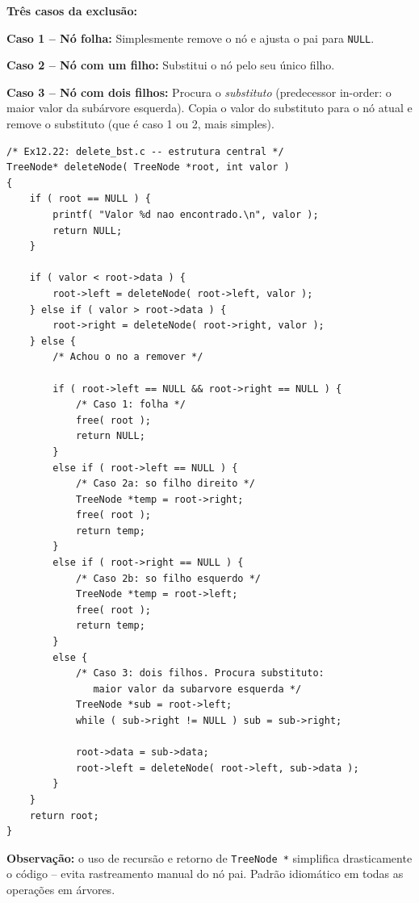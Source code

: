 \documentclass[12pt,a4paper]{article}
\begin{document}
\begin{respostabox}
\textbf{Três casos da exclusão:}

\textbf{Caso 1 -- Nó folha:}
Simplesmente remove o nó e ajusta o pai para \texttt{NULL}.

\textbf{Caso 2 -- Nó com um filho:}
Substitui o nó pelo seu único filho.

\textbf{Caso 3 -- Nó com dois filhos:}
Procura o \textit{substituto} (predecessor in-order: o maior valor da subárvore
esquerda). Copia o valor do substituto para o nó atual e remove o substituto
(que é caso 1 ou 2, mais simples).

\begin{lstlisting}
/* Ex12.22: delete_bst.c -- estrutura central */
TreeNode* deleteNode( TreeNode *root, int valor )
{
    if ( root == NULL ) {
        printf( "Valor %d nao encontrado.\n", valor );
        return NULL;
    }

    if ( valor < root->data ) {
        root->left = deleteNode( root->left, valor );
    } else if ( valor > root->data ) {
        root->right = deleteNode( root->right, valor );
    } else {
        /* Achou o no a remover */

        if ( root->left == NULL && root->right == NULL ) {
            /* Caso 1: folha */
            free( root );
            return NULL;
        }
        else if ( root->left == NULL ) {
            /* Caso 2a: so filho direito */
            TreeNode *temp = root->right;
            free( root );
            return temp;
        }
        else if ( root->right == NULL ) {
            /* Caso 2b: so filho esquerdo */
            TreeNode *temp = root->left;
            free( root );
            return temp;
        }
        else {
            /* Caso 3: dois filhos. Procura substituto:
               maior valor da subarvore esquerda */
            TreeNode *sub = root->left;
            while ( sub->right != NULL ) sub = sub->right;

            root->data = sub->data;
            root->left = deleteNode( root->left, sub->data );
        }
    }
    return root;
}
\end{lstlisting}

\textbf{Observação:} o uso de recursão e retorno de \texttt{TreeNode *} simplifica
drasticamente o código -- evita rastreamento manual do nó pai. Padrão idiomático
em todas as operações em árvores.
\end{respostabox}

\newpage

\end{document}
